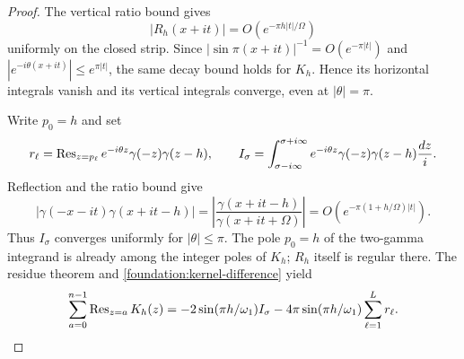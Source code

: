 \begin{proof}
The vertical ratio bound gives
\[
 |R_h(x+it)|=O(e^{-\pi h|t|/\Omega})
\]
uniformly on the closed strip. Since
$|\sin\pi(x+it)|^{-1}=O(e^{-\pi|t|})$ and
$|e^{-i\theta(x+it)}|\leq e^{\pi|t|}$, the same decay bound holds
for $K_h$. Hence its horizontal integrals vanish and its vertical
integrals converge, even at $|\theta|=\pi$.

Write $p_0=h$ and set
\[
 r_\ell=\operatorname{Res}_{z=p_\ell}
       e^{-i\theta z}\gamma(-z)\gamma(z-h),\qquad
 I_\sigma=\int_{\sigma-i\infty}^{\sigma+i\infty}
       e^{-i\theta z}\gamma(-z)\gamma(z-h)\frac{dz}{i}.
\]
Reflection and the ratio bound give
\[
 |\gamma(-x-it)\gamma(x+it-h)|
 =\left|\frac{\gamma(x+it-h)}{\gamma(x+it+\Omega)}\right|
 =O(e^{-\pi(1+h/\Omega)|t|}).
\]
Thus $I_\sigma$ converges uniformly for $|\theta|\leq\pi$.
The pole $p_0=h$ of the two-gamma integrand is already among the
integer poles of $K_h$; $R_h$ itself is regular there.
The residue theorem and \eqref{foundation:kernel-difference} yield
\begin{equation}\label{foundation:rectangle}
 \sum_{a=0}^{n-1}\operatorname{Res}_{z=a}K_h(z)
 =-2\sin(\pi h/\omega_1)I_\sigma
  -4\pi\sin(\pi h/\omega_1)\sum_{\ell=1}^{L}r_\ell.
\end{equation}


\end{proof}
